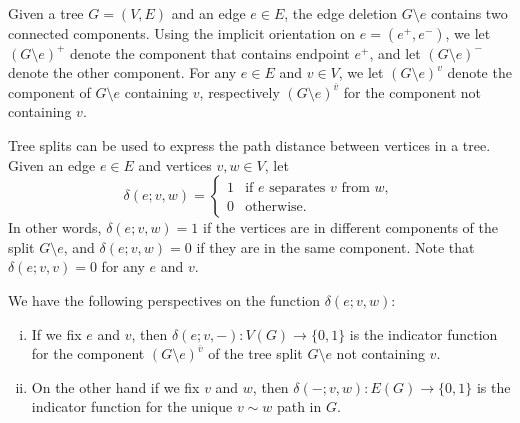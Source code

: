 \documentclass{amsart}
\theoremstyle{definition}
\begin{document}
Given a tree $G = (V,E)$ and an edge $e \in E$, the edge deletion $G \setminus e$ contains two connected components.
Using the implicit orientation on $e = (e^+,e^-)$,
we let $(G \setminus e)^+$ denote the component that contains endpoint $e^+$, and let $(G\setminus e)^-$ denote the other component.
For any $e \in E$ and $v \in V$,
we let
$(G \setminus e)^{v}$ denote the component of $G\setminus e$ containing $v$,
respectively $(G\setminus e)^{\overline v}$ for the component not containing $v$.


Tree splits can be used to express the path distance between vertices in a tree.
Given an edge $e\in E$ and vertices $v,w \in V$, let 
\begin{equation}
\delta(e;v,w) = \begin{cases}
	1 &\text{if $e$ separates  $v$ from $w$}, \\
	0 &\text{otherwise}.
\end{cases}
\end{equation}
In other words, $\delta(e; v,w) = 1$ if the vertices are in different components of the split $G \setminus e$,
and $\delta(e; v,w) = 0$ if they are in the same component.
Note that $\delta(e; v,v) = 0$ for any $e$ and $v$.

We have the following perspectives on the function $\delta(e; v,w)$:
\begin{enumerate}[(i)]
\item 
If we fix $e$ and $v$,
then $\delta(e;v, -) : V(G) \to \{0,1\}$ 
is the indicator function for the component 
$(G \setminus e)^{\overline v}$ of the tree split $G \setminus e$
not containing $v$.

\item 
On the other hand if we fix $v$ and $w$, then $\delta(-;v,w) : E(G) \to \{0,1\}$
is the indicator function for the unique $v \sim w$ path in $G$.

\end{enumerate}
\end{document}

